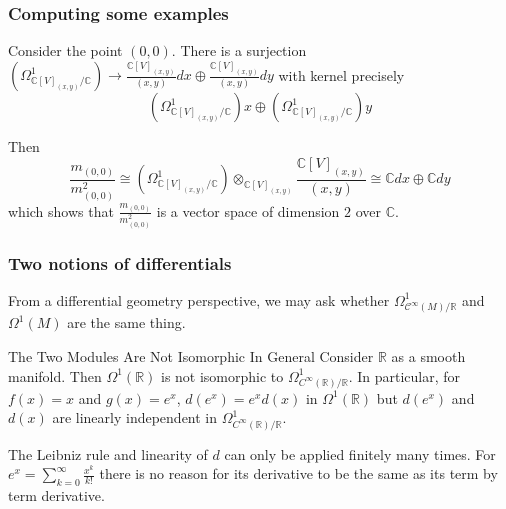 \documentclass[10pt]{beamer}
\newcommand{\R}{\mathbb{R}}
\newcommand{\C}{\mathbb{C}}
\newcommand{\mC}{\mathcal{C}}
\begin{document}
\begin{frame}[fragile]
\frametitle{Computing some examples}

\begin{block}{}
Consider the point $(0,0)$. There is a surjection $\left(\Omega_{\C[V]_{(x,y)}/\C}^1\right)\to\frac{\C[V]_{(x,y)}}{(x,y)}dx\oplus\frac{\C[V]_{(x,y)}}{(x,y)}dy$ with kernel precisely $$\left(\Omega_{\C[V]_{(x,y)}/\C}^1\right)x\oplus\left(\Omega_{\C[V]_{(x,y)}/\C}^1\right)y$$ 

Then $$\frac{m_{(0,0)}}{m_{(0,0)}^2}\cong\left(\Omega_{\C[V]_{(x,y)}/\C}^1\right)\otimes_{\C[V]_{(x,y)}}\frac{\C[V]_{(x,y)}}{(x,y)}\cong\C dx\oplus\C dy$$ which shows that $\frac{m_{(0,0)}}{m_{(0,0)}^2}$ is a vector space of dimension $2$ over $\C$. \\
\end{block}

\end{frame}

\begin{frame}[fragile]
\frametitle{Two notions of differentials}

From a differential geometry perspective, we may ask whether $\Omega_{\mC^\infty(M)/\R}^1$ and $\Omega^1(M)$ are the same thing. 

\begin{block}{The Two Modules Are Not Isomorphic In General} Consider $\R$ as a smooth manifold. Then $\Omega^1(\R)$ is not isomorphic to $\Omega_{C^\infty(\R)/\R}^1$. In particular, for $f(x)=x$ and $g(x)=e^x$, $d(e^x)=e^xd(x)$ in $\Omega^1(\R)$ but $d(e^x)$ and $d(x)$ are linearly independent in $\Omega_{C^\infty(\R)/\R}^1$. 
\end{block}

The Leibniz rule and linearity of $d$ can only be applied finitely many times. For $e^x=\sum_{k=0}^\infty\frac{x^k}{k!}$ there is no reason for its derivative to be the same as its term by term derivative. 

\end{frame}
\end{document}
